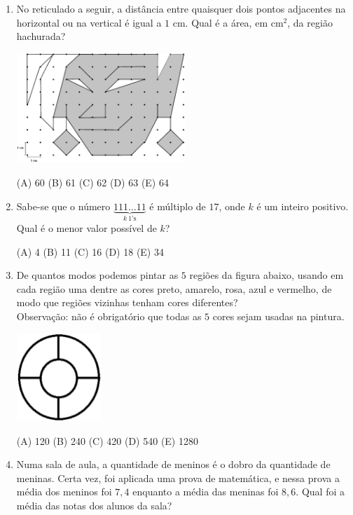 \documentclass[12pt]{article}
\begin{document}
\begin{enumerate}[label=\textbf{{\arabic*.}}]
(A) 30 segundos (B) 40 segundos (C) 50 segundos (D) 60 segundos (E) 70 segundos

\item No reticulado a seguir, a distância entre quaisquer dois pontos adjacentes na horizontal ou na vertical é igual a $1$ cm. Qual é a área, em cm$^{2}$, da região hachurada?

  \begin{center}
  \includegraphics[width=0.5\textwidth]{third.png}
\end{center}


(A) 60 (B) 61 (C) 62 (D) 63 (E) 64

\item Sabe-se que o número $\underbrace{111\ldots 11}_{k\ \text{1’s}}$ é múltiplo de $17$, onde $k$ é um inteiro positivo. Qual é o menor valor possível de $k$?

(A) 4 (B) 11 (C) 16 (D) 18 (E) 34

\item De quantos modos podemos pintar as $5$ regiões da figura abaixo, usando em cada região uma dentre as cores preto, amarelo, rosa, azul e vermelho, de modo que regiões vizinhas tenham cores diferentes? \\
Observação: não é obrigatório que todas as $5$ cores sejam usadas na pintura.


  \begin{center}
  \includegraphics[width=0.25\textwidth]{fourth.png}
\end{center}


(A) 120 (B) 240 (C) 420 (D) 540 (E) 1280

\item Numa sala de aula, a quantidade de meninos é o dobro da quantidade de meninas. Certa vez, foi aplicada uma prova de matemática, e nessa prova a média dos meninos foi $7,4$ enquanto a média das meninas foi $8,6$. Qual foi a média das notas dos alunos da sala?


\end{enumerate}
\end{document}

